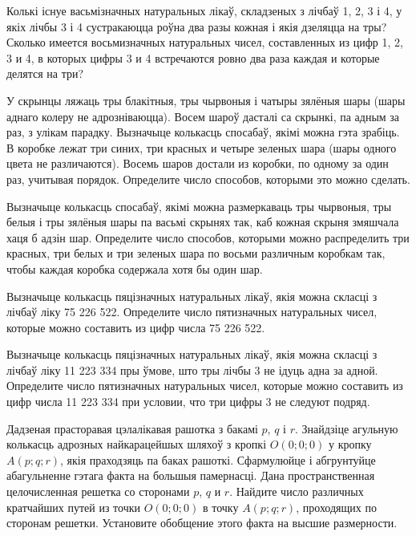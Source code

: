 \begin{problemList}
\problemItemSimple
{Колькі існуе васьмізначных натуральных лікаў, складзеных з лічбаў 1, 2, 3 і 4,
у якіх лічбы 3 і 4 сустракаюцца роўна два разы кожная і якія дзеляцца на тры?}
{Сколько имеется восьмизначных натуральных чисел, составленных
из цифр 1, 2, 3 и 4, в которых цифры 3 и 4 встречаются ровно
два раза каждая и которые делятся на три?}

\bigskip

\problemItemSimple
{У скрынцы ляжаць тры блакітныя, тры чырвоныя і чатыры зялёныя шары (шары аднаго колеру
не адрозніваюцца). Восем шароў дасталі са скрынкі, па адным за раз, з улікам парадку.
Вызначыце колькасць спосабаў, якімі можна гэта зрабіць.}
{В коробке лежат три синих, три красных и четыре зеленых шара (шары
одного цвета не различаются). Восемь шаров достали из коробки, по одному
за один раз, учитывая порядок. Определите число способов, которыми
это можно сделать.}

\bigskip

\problemItemSimple
{Вызначыце колькасць спосабаў, якімі можна размеркаваць тры чырвоныя, тры белыя і
тры зялёныя шары па васьмі скрынях так, каб кожная скрыня змяшчала хаця б адзін шар.}
{Определите число способов, которыми можно распределить три красных,
три белых и три зеленых шара по восьми различным коробкам так, чтобы
каждая коробка содержала хотя бы один шар.}

\bigskip

\problemItemSimple
{Вызначыце колькасць пяцізначных натуральных лікаў, якія можна скласці
з лічбаў ліку 75\,\,226\,\,522.}
{Определите число пятизначных натуральных чисел, которые можно составить
из цифр числа 75\,\,226\,\,522.}

\bigskip

\problemItemSimple
{Вызначыце колькасць пяцізначных натуральных лікаў, якія можна скласці
з лічбаў ліку 11\,\,223\,\,334 пры ўмове, што тры лічбы 3 не ідуць адна за адной.}
{Определите число пятизначных натуральных чисел, которые можно составить
из цифр числа 11\,\,223\,\,334 при условии, что три цифры 3 не следуют подряд.}

\bigskip

\problemItemSimple
{Дадзеная прасторавая цэлалікавая рашотка з бакамі $p$, $q$ і $r$.
Знайдзіце агульную колькасць адрозных найкарацейшых шляхоў з кропкі $O(0; 0; 0)$ у кропку
$A(p; q; r)$, якія праходзяць па баках рашоткі. Сфармулюйце і абгрунтуйце абагульненне гэтага
факта на большыя памернасці.}
{Дана пространственная целочисленная решетка со сторонами $p$, $q$ и $r$.
Найдите число различных кратчайших путей из точки $O(0; 0; 0)$ в точку
$A(p; q; r)$, проходящих по сторонам решетки. Установите обобщение этого
факта на высшие размерности.}


\end{problemList}
